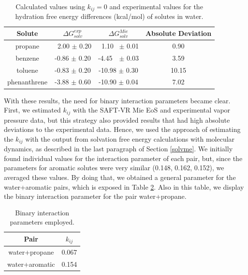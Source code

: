 \begin{table}[h]
    \centering
    \caption{Calculated values using $k_{ij}=0$ and experimental values for the hydration free energy differences (kcal/mol) of solutes in water.}
    \label{tbl:solv3}
    \begin{tabular}{cccc}
    	\hline\hline
    	Solute       & $\Delta G_{solv}^{exp}$ & $\Delta G_{solv}^{Mie}$ & Absolute Deviation \\ \hline\hline
    	propane      & $\,$ 2.00 $\pm$ 0.20         & $\,$ 1.10 $\,$ $\pm$ 0.01         & 0.90               \\
    	benzene      & -0.86 $\pm$ 0.20        & -4.45 $\, \,$ $\pm$ 0.03        & 3.59               \\
    	toluene      & -0.83 $\pm$ 0.20        & -10.98 $\pm$ 0.30       & 10.15              \\
    	phenanthrene & -3.88 $\pm$ 0.60        & -10.90 $\pm$ 0.04       & 7.02               \\ \hline\hline
    \end{tabular}
\end{table}
\FloatBarrier

With these results, the need for binary interaction parameters became clear. First, we estimated $k_{ij}$ with the SAFT-VR Mie EoS and experimental vapor pressure data, but this strategy also provided results that had high absolute deviations to the experimental data. Hence, we used the approach of estimating the $k_{ij}$ with the output from solvation free energy calculations with molecular dynamics, as described in the last paragraph of Section \ref{solvme}.  We initially found individual values for the interaction parameter of each pair, but, since the parameters for aromatic solutes were very similar (0.148, 0.162, 0.152), we averaged these values. By doing that,  we obtained a general parameter for the water+aromatic pairs, which is exposed in Table \ref{tbl:kij}. Also in this table, we display the binary interaction parameter for the pair water+propane. 

\begin{table}[h]
  \centering
  \caption{Binary interaction parameters employed.}
  \label{tbl:kij}
  \begin{tabular}{cc}
    \hline
    \hline
      Pair & $k_{ij}$ \\
    \hline\hline
    water+propane      & 0.067  \\
    water+aromatic      & 0.154 \\  
    \hline
    \hline
  \end{tabular}
\end{table}

